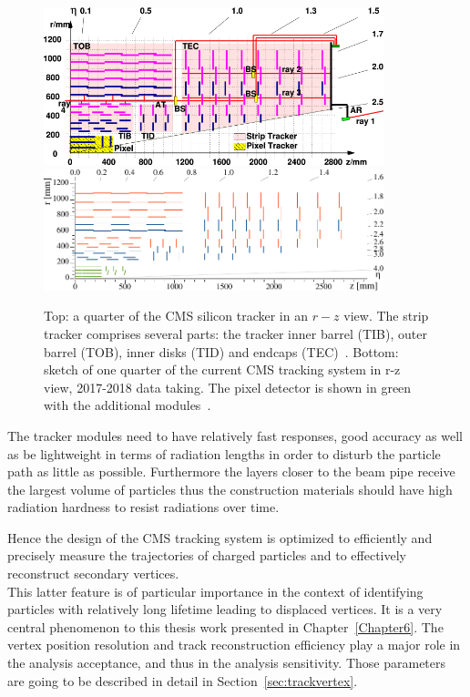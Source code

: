 \begin{figure}[h]
\centering
\includegraphics[width=0.88\textwidth]{Figures/c2/las}\\
\vspace{0.5cm}
\includegraphics[width=0.88\textwidth]{Figures/c2/Phase1_Tracker_1Quarter.pdf}
\vspace{0.5cm}

\caption{Top: a quarter of the CMS silicon tracker in an $r-z$
  view. The strip tracker comprises several parts: the tracker inner
  barrel (TIB), outer barrel (TOB), inner disks (TID) and endcaps
  (TEC)~\cite{Adam:1171503}. Bottom:
sketch of one quarter of the current CMS tracking system in
  r-z view, 2017-2018 data taking. The pixel detector is shown in
  green with the additional modules~\cite{trackingPU}.}
\label{fig:tracker}
\end{figure} 

The tracker modules need to have relatively fast responses, good
accuracy as well as be lightweight in terms of radiation lengths in
order to disturb the particle path as little as possible. Furthermore
the layers closer to the beam pipe receive
the largest volume of particles thus the construction materials should
have high radiation hardness to resist radiations over time.

Hence the design of the CMS tracking system is optimized to
efficiently and precisely measure the trajectories of charged
particles and to effectively reconstruct secondary vertices.\\
This latter feature is of particular
importance in the context of identifying particles with relatively
long lifetime leading to displaced vertices. It is a very central phenomenon
to this thesis work presented in Chapter~\ref{Chapter6}. The vertex position resolution and track
reconstruction efficiency play a major role in the analysis acceptance,
and thus in the analysis sensitivity. Those parameters are going to be
described in detail in Section~\ref{sec:trackvertex}.


